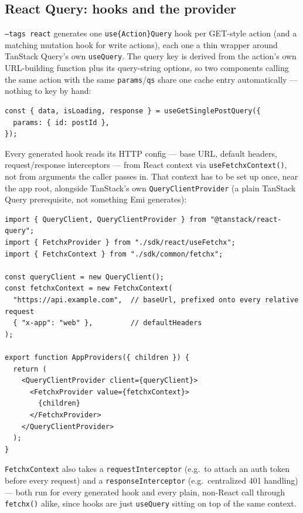 \subsection{React Query: hooks and the provider}
\label{sec:js-react-query}
\texttt{--tags react} generates one \texttt{use\{Action\}Query} hook per
GET-style action (and a matching mutation hook for write actions), each
one a thin wrapper around TanStack Query's own \texttt{useQuery}. The
query key is derived from the action's own URL-building function plus its
query-string options, so two components calling the same action with the
same \texttt{params}/\texttt{qs} share one cache entry automatically ---
nothing to key by hand:
\begin{lstlisting}
const { data, isLoading, response } = useGetSinglePostQuery({
  params: { id: postId },
});
\end{lstlisting}
Every generated hook reads its HTTP config --- base URL, default headers,
request/response interceptors --- from React context via
\texttt{useFetchxContext()}, not from arguments the caller passes in. That
context has to be set up once, near the app root, alongside TanStack's
own \texttt{QueryClientProvider} (a plain TanStack Query prerequisite,
not something Emi generates):
\begin{lstlisting}
import { QueryClient, QueryClientProvider } from "@tanstack/react-query";
import { FetchxProvider } from "./sdk/react/useFetchx";
import { FetchxContext } from "./sdk/common/fetchx";

const queryClient = new QueryClient();
const fetchxContext = new FetchxContext(
  "https://api.example.com",  // baseUrl, prefixed onto every relative request
  { "x-app": "web" },         // defaultHeaders
);

export function AppProviders({ children }) {
  return (
    <QueryClientProvider client={queryClient}>
      <FetchxProvider value={fetchxContext}>
        {children}
      </FetchxProvider>
    </QueryClientProvider>
  );
}
\end{lstlisting}
\texttt{FetchxContext} also takes a \texttt{requestInterceptor} (e.g.\ to
attach an auth token before every request) and a
\texttt{responseInterceptor} (e.g.\ centralized 401 handling) --- both
run for every generated hook and every plain, non-React call through
\texttt{fetchx()} alike, since hooks are just \texttt{useQuery} sitting on
top of the same context.
